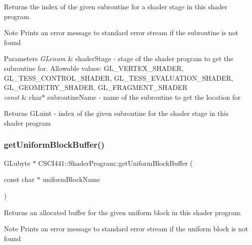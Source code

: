 Returns the index of the given subroutine for a shader stage in this shader program. 

\begin{DoxyNote}{Note}
Prints an error message to standard error stream if the subroutine is not found 
\end{DoxyNote}

\begin{DoxyParams}{Parameters}
{\em G\+Lenum} & shader\+Stage -\/ stage of the shader program to get the subroutine for. Allowable values\+: G\+L\+\_\+\+V\+E\+R\+T\+E\+X\+\_\+\+S\+H\+A\+D\+ER, G\+L\+\_\+\+T\+E\+S\+S\+\_\+\+C\+O\+N\+T\+R\+O\+L\+\_\+\+S\+H\+A\+D\+ER, G\+L\+\_\+\+T\+E\+S\+S\+\_\+\+E\+V\+A\+L\+U\+A\+T\+I\+O\+N\+\_\+\+S\+H\+A\+D\+ER, G\+L\+\_\+\+G\+E\+O\+M\+E\+T\+R\+Y\+\_\+\+S\+H\+A\+D\+ER, G\+L\+\_\+\+F\+R\+A\+G\+M\+E\+N\+T\+\_\+\+S\+H\+A\+D\+ER \\
\hline
{\em const} & char$\ast$ subroutine\+Name -\/ name of the subroutine to get the location for \\
\hline
\end{DoxyParams}
\begin{DoxyReturn}{Returns}
G\+Luint -\/ index of the given subroutine for the shader stage in this shader program 
\end{DoxyReturn}
\mbox{\label{class_c_s_c_i441_1_1_shader_program_a7a3246df6f87b0b4c7cfbce0a39e8330}} 
\subsubsection{\texorpdfstring{get\+Uniform\+Block\+Buffer()}{getUniformBlockBuffer()}}
{\footnotesize\ttfamily G\+Lubyte $\ast$ C\+S\+C\+I441\+::\+Shader\+Program\+::get\+Uniform\+Block\+Buffer (\begin{DoxyParamCaption}\item[{const char $\ast$}]{uniform\+Block\+Name }\end{DoxyParamCaption})}



Returns an allocated buffer for the given uniform block in this shader program. 

\begin{DoxyNote}{Note}
Prints an error message to standard error stream if the uniform block is not found 
\end{DoxyNote}

